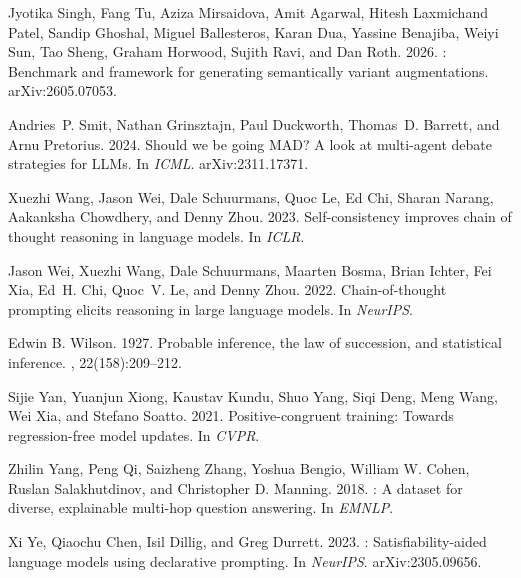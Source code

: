 \documentclass[11pt]{article}%
\begin{document}
\begin{thebibliography}{}
Jyotika Singh, Fang Tu, Aziza Mirsaidova, Amit Agarwal, Hitesh Laxmichand
  Patel, Sandip Ghoshal, Miguel Ballesteros, Karan Dua, Yassine Benajiba,
  Weiyi Sun, Tao Sheng, Graham Horwood, Sujith Ravi, and Dan Roth. 2026.
: Benchmark and framework for generating semantically
  variant augmentations.
\newblock arXiv:2605.07053.

Andries~P. Smit, Nathan Grinsztajn, Paul Duckworth, Thomas~D. Barrett, and
  Arnu Pretorius. 2024.
\newblock Should we be going {MAD}? {A} look at multi-agent debate strategies
  for {LLMs}.
\newblock In {\em ICML}. arXiv:2311.17371.

Xuezhi Wang, Jason Wei, Dale Schuurmans, Quoc Le, Ed Chi, Sharan Narang,
  Aakanksha Chowdhery, and Denny Zhou. 2023.
\newblock Self-consistency improves chain of thought reasoning in language
  models.
\newblock In {\em ICLR}.

Jason Wei, Xuezhi Wang, Dale Schuurmans, Maarten Bosma, Brian Ichter, Fei Xia,
  Ed~H. Chi, Quoc~V. Le, and Denny Zhou. 2022.
\newblock Chain-of-thought prompting elicits reasoning in large language
  models.
\newblock In {\em NeurIPS}.

Edwin B. Wilson. 1927.
\newblock Probable inference, the law of succession, and statistical
  inference.
,
  22(158):209--212.

Sijie Yan, Yuanjun Xiong, Kaustav Kundu, Shuo Yang, Siqi Deng, Meng Wang, Wei
  Xia, and Stefano Soatto. 2021.
\newblock Positive-congruent training: Towards regression-free model updates.
\newblock In {\em CVPR}.

Zhilin Yang, Peng Qi, Saizheng Zhang, Yoshua Bengio, William W. Cohen, Ruslan
  Salakhutdinov, and Christopher D. Manning. 2018.
: A dataset for diverse, explainable multi-hop question
  answering.
\newblock In {\em EMNLP}.

Xi Ye, Qiaochu Chen, Isil Dillig, and Greg Durrett. 2023.
: Satisfiability-aided language models using declarative
  prompting.
\newblock In {\em NeurIPS}. arXiv:2305.09656.

\end{thebibliography}
\end{document}
